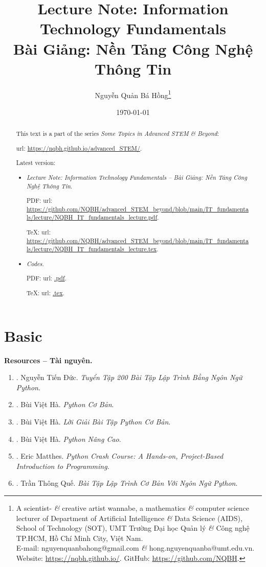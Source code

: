 \documentclass{article}
\title{Lecture Note: Information Technology Fundamentals\\Bài Giảng: Nền Tảng Công Nghệ Thông Tin}
\author{Nguyễn Quản Bá Hồng\footnote{A scientist- {\it\&} creative artist wannabe, a mathematics {\it\&} computer science lecturer of Department of Artificial Intelligence {\it\&} Data Science (AIDS), School of Technology (SOT), UMT Trường Đại học Quản lý {\it\&} Công nghệ TP.HCM, Hồ Chí Minh City, Việt Nam.\\E-mail: {\sf nguyenquanbahong@gmail.com} {\it\&} {\sf hong.nguyenquanba@umt.edu.vn}. Website: \url{https://nqbh.github.io/}. GitHub: \url{https://github.com/NQBH}.}}
\date{\today}
\begin{document}
\maketitle
\begin{abstract}
	This text is a part of the series {\it Some Topics in Advanced STEM \& Beyond}:
	
	{\sc url}: \url{https://nqbh.github.io/advanced_STEM/}.
	
	Latest version:
	\begin{itemize}
		\item {\it Lecture Note: Information Technology Fundamentals -- Bài Giảng: Nền Tảng Công Nghệ Thông Tin}.
		
		PDF: {\sc url}: \url{https://github.com/NQBH/advanced_STEM_beyond/blob/main/IT_fundamentals/lecture/NQBH_IT_fundamentals_lecture.pdf}.
		
		\TeX: {\sc url}: \url{https://github.com/NQBH/advanced_STEM_beyond/blob/main/IT_fundamentals/lecture/NQBH_IT_fundamentals_lecture.tex}.
		\item {\it Codes}.
		
		PDF: {\sc url}: \url{.pdf}.
		
		\TeX: {\sc url}: \url{.tex}.
	\end{itemize}
\end{abstract}
\tableofcontents


\section{Basic}
\textbf{\textsf{Resources -- Tài nguyên.}}
\begin{enumerate}
	\item \cite{Duc_200_BT_Python}. {\sc Nguyễn Tiến Đức}. {\it Tuyển Tập 200 Bài Tập Lập Trình Bằng Ngôn Ngữ Python}.
	\item \cite{Ha_Python_co_ban}. {\sc Bùi Việt Hà}. {\it Python Cơ Bản}.
	\item \cite{Ha_loi_giai_BT_Python_co_ban}. {\sc Bùi Việt Hà}. {\it Lời Giải Bài Tập Python Cơ Bản}.
	\item \cite{Ha_Python_nang_cao}. {\sc Bùi Việt Hà}. {\it Python Nâng Cao}.
	\item \cite{Matthes2019,Matthes2023}. {\sc Eric Matthes}. {\it Python Crash Course: A Hands-on, Project-Based Introduction to Programming}.
	\item \cite{Que_BT_Python}. {\sc Trần Thông Quế}. {\it Bài Tập Lập Trình Cơ Bản Với Ngôn Ngữ Python}.
\end{enumerate}
\end{document}
